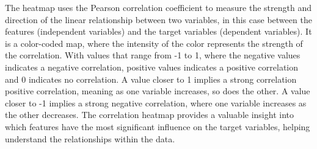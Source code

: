 The heatmap uses the Pearson correlation coefficient to measure the strength and direction of the linear relationship between two variables, in this case between the features
(independent variables) and the target variables (dependent variables). It is a color-coded map, where the intensity of the color represents the strength of the correlation.
With values that range from -1 to 1, where the negative values indicates a negative correlation, positive values indicates a positive correlation and 0 indicates no correlation.
A value closer to 1 implies a strong correlation positive correlation, meaning as one variable increases, so does the other. A value closer to -1 implies a strong negative correlation,
where one variable increases as the other decreases. The correlation heatmap provides a valuable insight into which features have the most
significant influence on the target variables, helping understand the relationships within the data.

